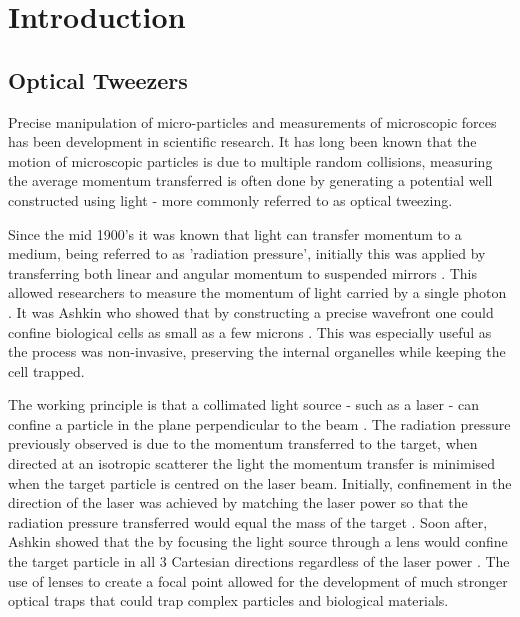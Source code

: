 \chapter{Introduction}
\section{Optical Tweezers}
Precise manipulation of micro-particles and measurements of 
microscopic forces has been development in scientific research.
It has long been known that the motion of microscopic particles 
is due to multiple random collisions, measuring the average 
momentum transferred is often done by generating a potential 
well constructed using light - more commonly referred to as 
optical tweezing. 

Since the mid 1900's it was known that light can transfer momentum 
to a medium, being referred to as 'radiation pressure', initially 
this was applied by transferring both linear and angular momentum 
to suspended mirrors \cite{Beth1936MechanicalDA}. This allowed 
researchers to measure the momentum of light carried by a single 
photon \cite{Beth1936MechanicalDA}. It was Ashkin who showed that 
by constructing a precise wavefront one could confine biological 
cells as small as a few microns \cite{Ashkin1970}. This was 
especially useful as the process was non-invasive, preserving the 
internal organelles while keeping the cell trapped. 

The working principle is that a collimated light source - such as 
a laser - can confine a particle in the plane perpendicular to the 
beam \cite{Ashkin1970}. The radiation pressure previously observed 
is due to the momentum transferred to the target, when directed at 
an isotropic scatterer the light the momentum transfer is minimised
when the target particle is centred on the laser beam. Initially, 
confinement in the direction of the laser was achieved by matching 
the laser power so that the radiation pressure transferred would equal 
the mass of the target \cite{Ashkin1970}. Soon after, Ashkin showed 
that the by focusing the light source through a lens would confine 
the target particle in all 3 Cartesian directions regardless of the
laser power \cite{Ashkin1980}. The use of lenses to create a focal
point allowed for the development of much stronger optical traps that
could trap complex particles and biological materials. 

